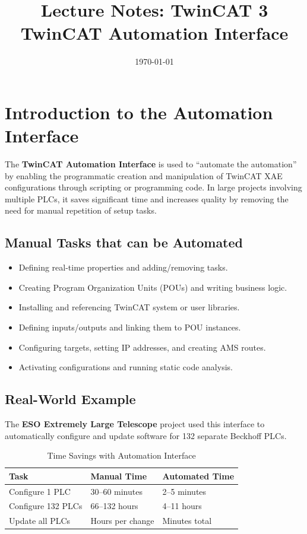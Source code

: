 \documentclass[11pt,a4paper]{article}
\title{
    \vspace{-1cm}
    \textbf{Lecture Notes: TwinCAT 3}\\
    \Large TwinCAT Automation Interface
}
\author{}
\date{\today}
\begin{document}
\maketitle

\tableofcontents
\newpage

\section{Introduction to the Automation Interface}

The \textbf{TwinCAT Automation Interface} is used to ``automate the automation'' by enabling the programmatic creation and manipulation of TwinCAT XAE configurations through scripting or programming code. In large projects involving multiple PLCs, it saves significant time and increases quality by removing the need for manual repetition of setup tasks.

\subsection{Manual Tasks that can be Automated}

\begin{itemize}[leftmargin=*]
    \item Defining real-time properties and adding/removing tasks.
    \item Creating Program Organization Units (POUs) and writing business logic.
    \item Installing and referencing TwinCAT system or user libraries.
    \item Defining inputs/outputs and linking them to POU instances.
    \item Configuring targets, setting IP addresses, and creating AMS routes.
    \item Activating configurations and running static code analysis.
\end{itemize}

\subsection{Real-World Example}

The \textbf{ESO Extremely Large Telescope} project used this interface to automatically configure and update software for 132 separate Beckhoff PLCs.

\begin{table}[h]
\centering
\begin{tabular}{@{}lll@{}}
\toprule
\textbf{Task} & \textbf{Manual Time} & \textbf{Automated Time} \\
\midrule
Configure 1 PLC & 30--60 minutes & 2--5 minutes \\
Configure 132 PLCs & 66--132 hours & 4--11 hours \\
Update all PLCs & Hours per change & Minutes total \\
\bottomrule
\end{tabular}
\caption{Time Savings with Automation Interface}
\end{table}
\end{document}
